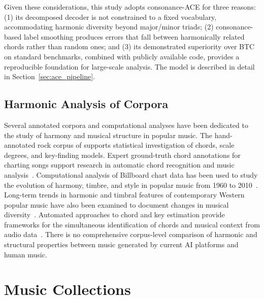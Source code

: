 \documentclass{article}
\begin{document}
Given these considerations, this study adopts consonance-ACE \citep{poltronieri2025discord} for three reasons: (1) its decomposed decoder is not constrained to a fixed vocabulary, accommodating harmonic diversity beyond major/minor triads; (2) consonance-based label smoothing produces errors that fall between harmonically related chords rather than random ones; and (3) its demonstrated superiority over BTC on standard benchmarks, combined with publicly available code, provides a reproducible foundation for large-scale analysis. The model is described in detail in Section~\ref{sec:ace_pipeline}.

\subsection{Harmonic Analysis of Corpora}
Several annotated corpora and computational analyses have been dedicated to the study of harmony and musical structure in popular music. The hand-annotated rock corpus of \citet{temperley2013statistical} supports statistical investigation of chords, scale degrees, and key-finding models. Expert ground-truth chord annotations for charting songs support research in automatic chord recognition and music analysis~\citep{burgoyne2011expert}. Computational analysis of Billboard chart data has been used to study the evolution of harmony, timbre, and style in popular music from 1960 to 2010~\citep{mauch2015evolution}. Long-term trends in harmonic and timbral features of contemporary Western popular music have also been examined to document changes in musical diversity~\citep{serra2012measuring}. Automated approaches to chord and key estimation provide frameworks for the simultaneous identification of chords and musical context from audio data~\citep{mauch2009simultaneous}. There is no comprehensive corpus-level comparison of harmonic and structural properties between music generated by current AI platforms and human music.

\section{Music Collections}
\label{sec:corpora}
\end{document}
